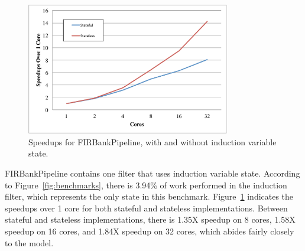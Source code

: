 \begin{figure}[t]
\includegraphics[width=3.5in]{figures/firbank-results.pdf}
\caption{Speedups for FIRBankPipeline, with and without induction variable state.  \protect\label{fig:firbank-results}}
\end{figure}

FIRBankPipeline contains one filter that uses induction variable state.  According to Figure~\ref{fig:benchmarks}, there is 3.94\% of work performed in the induction filter, which represents the only state in this benchmark.  Figure~\ref{fig:firbank-results} indicates the speedups over 1 core for both stateful and stateless implementations.  Between stateful and stateless implementations, there is 1.35X speedup on 8 cores, 1.58X speedup on 16 cores, and 1.84X speedup on 32 cores, which abides fairly closely to the model.